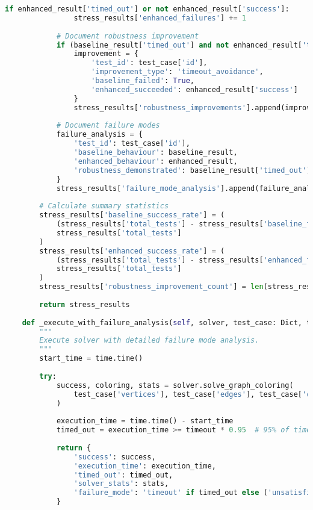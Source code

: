 \begin{lstlisting}[language=Python, caption=Stress Testing Framework for Worst-Case Validation]
            if enhanced_result['timed_out'] or not enhanced_result['success']:
                stress_results['enhanced_failures'] += 1
            
            # Document robustness improvement
            if (baseline_result['timed_out'] and not enhanced_result['timed_out']):
                improvement = {
                    'test_id': test_case['id'],
                    'improvement_type': 'timeout_avoidance',
                    'baseline_failed': True,
                    'enhanced_succeeded': enhanced_result['success']
                }
                stress_results['robustness_improvements'].append(improvement)
            
            # Document failure modes
            failure_analysis = {
                'test_id': test_case['id'],
                'baseline_behaviour': baseline_result,
                'enhanced_behaviour': enhanced_result,
                'robustness_demonstrated': baseline_result['timed_out'] and not enhanced_result['timed_out']
            }
            stress_results['failure_mode_analysis'].append(failure_analysis)
        
        # Calculate summary statistics
        stress_results['baseline_success_rate'] = (
            (stress_results['total_tests'] - stress_results['baseline_failures']) / 
            stress_results['total_tests']
        )
        stress_results['enhanced_success_rate'] = (
            (stress_results['total_tests'] - stress_results['enhanced_failures']) / 
            stress_results['total_tests']
        )
        stress_results['robustness_improvement_count'] = len(stress_results['robustness_improvements'])
        
        return stress_results
    
    def _execute_with_failure_analysis(self, solver, test_case: Dict, timeout: float) -> Dict:
        """
        Execute solver with detailed failure mode analysis.
        """
        start_time = time.time()
        
        try:
            success, coloring, stats = solver.solve_graph_coloring(
                test_case['vertices'], test_case['edges'], test_case['colors'], timeout
            )
            
            execution_time = time.time() - start_time
            timed_out = execution_time >= timeout * 0.95  # 95% of timeout threshold
            
            return {
                'success': success,
                'execution_time': execution_time,
                'timed_out': timed_out,
                'solver_stats': stats,
                'failure_mode': 'timeout' if timed_out else ('unsatisfiable' if not success else None)
            }
            

\end{lstlisting}
